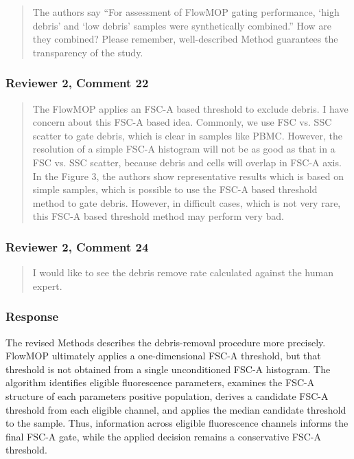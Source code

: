 \documentclass[
  11pt,
  a4paper,
]{article}
\begin{document}
\begin{quote}
The authors say ``For assessment of FlowMOP gating performance, `high
debris' and `low debris' samples were synthetically combined.'' How are
they combined? Please remember, well-described Method guarantees the
transparency of the study.
\end{quote}

\subsubsection{Reviewer 2, Comment 22}\label{reviewer-2-comment-22}

\begin{quote}
The FlowMOP applies an FSC-A based threshold to exclude debris. I have
concern about this FSC-A based idea. Commonly, we use FSC vs. SSC
scatter to gate debris, which is clear in samples like PBMC. However,
the resolution of a simple FSC-A histogram will not be as good as that
in a FSC vs. SSC scatter, because debris and cells will overlap in FSC-A
axis. In the Figure 3, the authors show representative results which is
based on simple samples, which is possible to use the FSC-A based
threshold method to gate debris. However, in difficult cases, which is
not very rare, this FSC-A based threshold method may perform very bad.
\end{quote}

\subsubsection{Reviewer 2, Comment 24}\label{reviewer-2-comment-24}

\begin{quote}
I would like to see the debris remove rate calculated against the human
expert.
\end{quote}

\subsubsection{Response}\label{response-9}

The revised Methods describes the debris-removal procedure more
precisely. FlowMOP ultimately applies a one-dimensional FSC-A threshold,
but that threshold is not obtained from a single unconditioned FSC-A
histogram. The algorithm identifies eligible fluorescence parameters,
examines the FSC-A structure of each parameter\textquotesingle s
positive population, derives a candidate FSC-A threshold from each
eligible channel, and applies the median candidate threshold to the
sample. Thus, information across eligible fluorescence channels informs
the final FSC-A gate, while the applied decision remains a conservative
FSC-A threshold.
\end{document}
